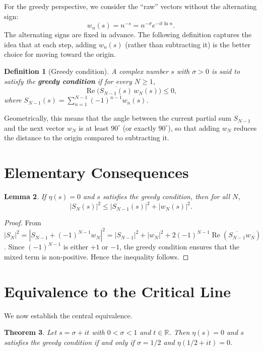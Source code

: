 \documentclass[12pt,a4paper]{article}
\newtheorem{theorem}{Theorem}[section]
\newtheorem{lemma}[theorem]{Lemma}
\newtheorem{definition}[theorem]{Definition}
\begin{document}
For the greedy perspective, we consider the “raw” vectors without the alternating sign:
\[
w_n(s)=n^{-s}=n^{-\sigma}e^{-it\ln n}.
\]
The alternating signs are fixed in advance. The following definition captures the idea that at each step, adding $w_n(s)$ (rather than subtracting it) is the better choice for moving toward the origin.

\begin{definition}[Greedy condition]
A complex number $s$ with $\sigma>0$ is said to satisfy the \textbf{greedy condition} if for every $N\ge1$,
\[
\operatorname{Re}\bigl(\overline{S_{N-1}(s)}\,w_N(s)\bigr)\le 0,
\]
where $S_{N-1}(s)=\sum_{n=1}^{N-1} (-1)^{n-1} w_n(s)$.
\end{definition}

Geometrically, this means that the angle between the current partial sum $S_{N-1}$ and the next vector $w_N$ is at least $90^\circ$ (or exactly $90^\circ$), so that adding $w_N$ reduces the distance to the origin compared to subtracting it.

\section{Elementary Consequences}

\begin{lemma}
If $\eta(s)=0$ and $s$ satisfies the greedy condition, then for all $N$,
\[
|S_N(s)|^2 \le |S_{N-1}(s)|^2 + |w_N(s)|^2.
\]
\end{lemma}
\begin{proof}
From $|S_N|^2 = |S_{N-1}+(-1)^{N-1}w_N|^2 = |S_{N-1}|^2 + |w_N|^2 + 2(-1)^{N-1}\operatorname{Re}(\overline{S_{N-1}}w_N)$. Since $(-1)^{N-1}$ is either $+1$ or $-1$, the greedy condition ensures that the mixed term is non‑positive. Hence the inequality follows.
\end{proof}

\section{Equivalence to the Critical Line}

We now establish the central equivalence.

\begin{theorem}
Let $s=\sigma+it$ with $0<\sigma<1$ and $t\in\mathbb{R}$. Then $\eta(s)=0$ and $s$ satisfies the greedy condition if and only if $\sigma=1/2$ and $\eta(1/2+it)=0$.
\end{theorem}
\end{document}
